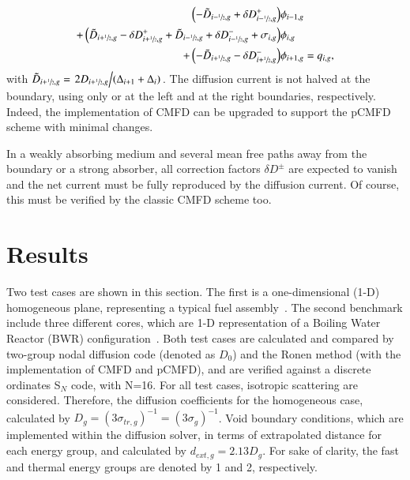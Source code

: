 \begin{equation}
  \label{eq:pCMFD-rearrange}
  \begin{split}
  \left(-\tilde{D}_{i-\sfrac{1}{2},g}+\delta D^+_{i-\sfrac{1}{2},g}\right)&\phi_{i-1,g} \\
  + \left( \tilde{D}_{i+\sfrac{1}{2},g} - \delta D^+_{i+\sfrac{1}{2},g} + \tilde{D}_{i-\sfrac{1}{2},g} + \delta D^-_{i-\sfrac{1}{2},g} + \sigma_{i,g}\right)&\phi_{i,g} \\
  + \left( -\tilde{D}_{i+\sfrac{1}{2},g} - \delta D^-_{i+\sfrac{1}{2},g}\right)&\phi_{i+1,g} = q_{i,g},
  \end{split}
\end{equation}
with $\tilde{D}_{i+\sfrac{1}{2},g} = \left. 2D_{i+\sfrac{1}{2},g} \middle/ (\Delta_{i+1}+\Delta_{i})\right.$. The diffusion current is not halved at the boundary, using only  or  at the left and at the right boundaries, respectively. Indeed, the implementation of CMFD can be upgraded to support the pCMFD scheme with minimal changes.

In a weakly absorbing medium and several mean free paths away from the boundary or a strong absorber, all correction factors $\delta D^\pm$ are expected to vanish and the net current must be fully reproduced by the diffusion current. Of course, this must be verified by the classic CMFD scheme too.

\section{Results}
\label{sec:res}
Two test cases are shown in this section. The first is a one-dimensional (1-D) homogeneous plane, representing a typical fuel assembly~\cite{Tomatis-2011}. The second benchmark include three different cores, which are 1-D representation of a Boiling Water Reactor (BWR) configuration~\cite{Rahnema-1997}. Both test cases are calculated and compared by two-group nodal diffusion code (denoted as $D_0$) and the Ronen method (with the implementation of CMFD and pCMFD), and are verified against a discrete ordinates S$_N$ code, with N=16. For all test cases, isotropic scattering are considered. Therefore, the diffusion coefficients for the homogeneous case, calculated by $D_g = (3\sigma_{tr,g})^{-1} = (3\sigma_g)^{-1}$. Void boundary conditions, which are implemented within the diffusion solver, in terms of extrapolated distance for each energy group, and calculated by $d_{ext,g} = 2.13 D_g$. For sake of clarity, the fast and thermal energy groups are denoted by 1 and 2, respectively.

